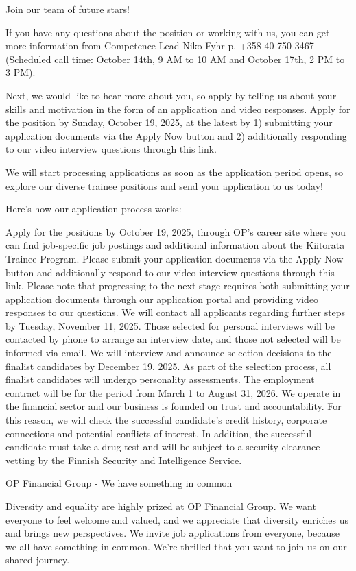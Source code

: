 \documentclass[a4paper,11pt]{article}
\begin{document}
Join our team of future stars!

If you have any questions about the position or working with us, you can get more information from Competence Lead Niko Fyhr p. +358 40 750 3467 (Scheduled call time: October 14th, 9 AM to 10 AM and October 17th, 2 PM to 3 PM).

Next, we would like to hear more about you, so apply by telling us about your skills and motivation in the form of an application and video responses. Apply for the position by Sunday, October 19, 2025, at the latest by 1) submitting your application documents via the Apply Now button and 2) additionally responding to our video interview questions through this link.

We will start processing applications as soon as the application period opens, so explore our diverse trainee positions and send your application to us today!

Here's how our application process works:


Apply for the positions by October 19, 2025, through OP's career site where you can find job-specific job postings and additional information about the Kiitorata Trainee Program.
Please submit your application documents via the Apply Now button and additionally respond to our video interview questions through this link. Please note that progressing to the next stage requires both submitting your application documents through our application portal and providing video responses to our questions.
We will contact all applicants regarding further steps by Tuesday, November 11, 2025. Those selected for personal interviews will be contacted by phone to arrange an interview date, and those not selected will be informed via email.
We will interview and announce selection decisions to the finalist candidates by December 19, 2025. As part of the selection process, all finalist candidates will undergo personality assessments.
The employment contract will be for the period from March 1 to August 31, 2026.
We operate in the financial sector and our business is founded on trust and accountability. For this reason, we will check the successful candidate's credit history, corporate connections and potential conflicts of interest. In addition, the successful candidate must take a drug test and will be subject to a security clearance vetting by the Finnish Security and Intelligence Service.

OP Financial Group - We have something in common
 

Diversity and equality are highly prized at OP Financial Group. We want everyone to feel welcome and valued, and we appreciate that diversity enriches us and brings new perspectives. We invite job applications from everyone, because we all have something in common. We're thrilled that you want to join us on our shared journey.
\end{document}
